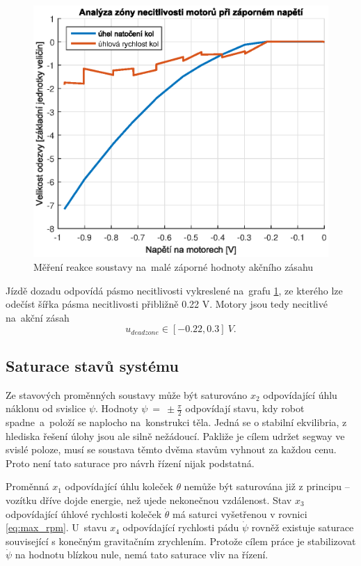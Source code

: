 \documentclass[conference]{IEEEtran}
\begin{document}
\begin{figure}[htbp]
    \centerline{\includegraphics[width=\linewidth]{deadzone_motory_vzad.eps}}
    \caption{Měření reakce soustavy na~malé záporné hodnoty akčního zásahu}
    \label{fig:deadzone_vzad}        
\end{figure}

Jízdě dozadu odpovídá pásmo necitlivosti vykreslené na~grafu \ref{fig:deadzone_vzad}, ze kterého
lze odečíst šířka pásma necitlivosti přibližně 0.22 \si{V}. Motory jsou tedy necitlivé
na~akční zásah
\begin{equation}
    u_{deadzone} \in [-0.22, 0.3] ~\si{V}.
    \label{eq:deadzone}
\end{equation}

\subsection{Saturace stavů systému}
\label{sec:saturace}

Ze stavových proměnných soustavy může být saturováno $x_2$ odpovídající úhlu náklonu od svislice $\psi$.
Hodnoty $\psi~=~\pm \frac{\pi}{2}$ odpovídají stavu, kdy robot spadne~a~položí se naplocho na~konstrukci těla.
Jedná se o stabilní ekvilibria, z hlediska řešení úlohy jsou ale silně nežádoucí. Pakliže je cílem udržet segway ve svislé poloze,
musí se soustava těmto dvěma stavům vyhnout za každou cenu. Proto není tato saturace pro návrh řízení nijak podstatná.

Proměnná $x_1$ odpovídající úhlu koleček $\theta$ nemůže být saturována již z principu -- vozítku dříve dojde energie, než ujede nekonečnou vzdálenost.
Stav $x_3$ odpovídající úhlové rychlosti koleček $\dot{\theta}$ má saturci vyšetřenou v rovnici \eqref{eq:max_rpm}. U~stavu $x_4$ odpovídající rychlosti pádu $\dot{\psi}$
rovněž existuje saturace související s konečným gravitačním zrychlením. Protože cílem práce je stabilizovat $\dot{\psi}$ na hodnotu blízkou nule, nemá tato saturace vliv na řízení.
\end{document}
